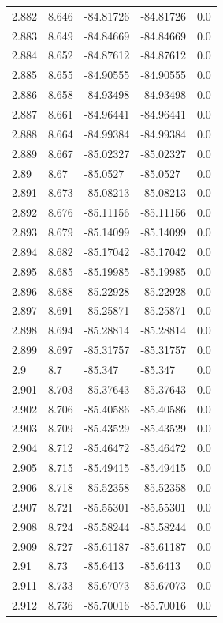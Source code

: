 \begin{tabular}{lllll}
2.882 & 8.646 & -84.81726 & -84.81726 & 0.0 \\
2.883 & 8.649 & -84.84669 & -84.84669 & 0.0 \\
2.884 & 8.652 & -84.87612 & -84.87612 & 0.0 \\
2.885 & 8.655 & -84.90555 & -84.90555 & 0.0 \\
2.886 & 8.658 & -84.93498 & -84.93498 & 0.0 \\
2.887 & 8.661 & -84.96441 & -84.96441 & 0.0 \\
2.888 & 8.664 & -84.99384 & -84.99384 & 0.0 \\
2.889 & 8.667 & -85.02327 & -85.02327 & 0.0 \\
2.89 & 8.67 & -85.0527 & -85.0527 & 0.0 \\
2.891 & 8.673 & -85.08213 & -85.08213 & 0.0 \\
2.892 & 8.676 & -85.11156 & -85.11156 & 0.0 \\
2.893 & 8.679 & -85.14099 & -85.14099 & 0.0 \\
2.894 & 8.682 & -85.17042 & -85.17042 & 0.0 \\
2.895 & 8.685 & -85.19985 & -85.19985 & 0.0 \\
2.896 & 8.688 & -85.22928 & -85.22928 & 0.0 \\
2.897 & 8.691 & -85.25871 & -85.25871 & 0.0 \\
2.898 & 8.694 & -85.28814 & -85.28814 & 0.0 \\
2.899 & 8.697 & -85.31757 & -85.31757 & 0.0 \\
2.9 & 8.7 & -85.347 & -85.347 & 0.0 \\
2.901 & 8.703 & -85.37643 & -85.37643 & 0.0 \\
2.902 & 8.706 & -85.40586 & -85.40586 & 0.0 \\
2.903 & 8.709 & -85.43529 & -85.43529 & 0.0 \\
2.904 & 8.712 & -85.46472 & -85.46472 & 0.0 \\
2.905 & 8.715 & -85.49415 & -85.49415 & 0.0 \\
2.906 & 8.718 & -85.52358 & -85.52358 & 0.0 \\
2.907 & 8.721 & -85.55301 & -85.55301 & 0.0 \\
2.908 & 8.724 & -85.58244 & -85.58244 & 0.0 \\
2.909 & 8.727 & -85.61187 & -85.61187 & 0.0 \\
2.91 & 8.73 & -85.6413 & -85.6413 & 0.0 \\
2.911 & 8.733 & -85.67073 & -85.67073 & 0.0 \\
2.912 & 8.736 & -85.70016 & -85.70016 & 0.0 \\

\end{tabular}
